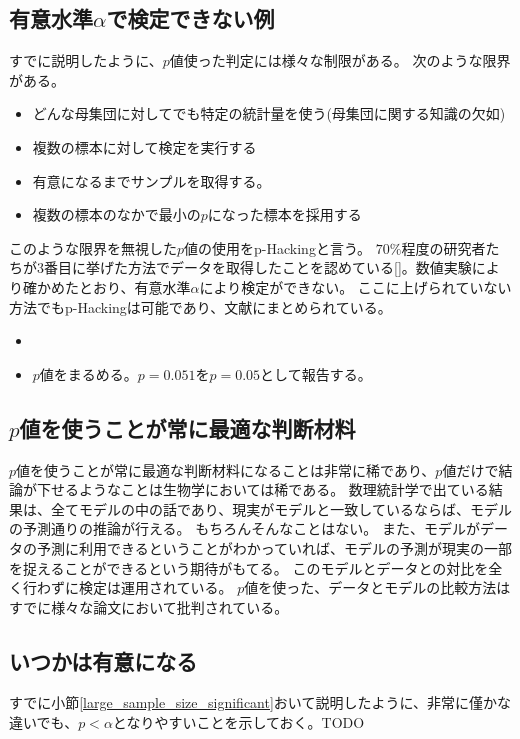 \subsection{有意水準$\alpha$で検定できない例}
すでに説明したように、$p$値使った判定には様々な制限がある。
次のような限界がある。

\begin{itemize}
  \item どんな母集団に対してでも特定の統計量を使う(母集団に関する知識の欠如)
  \item 複数の標本に対して検定を実行する
  \item 有意になるまでサンプルを取得する。
  \item 複数の標本のなかで最小の$p$になった標本を採用する
\end{itemize}

このような限界を無視した$p$値の使用をp-Hackingと言う。
$70\%$程度の研究者たちが3番目に挙げた方法でデータを取得したことを認めている[\cite{john2012measuring}]。数値実験により確かめたとおり、有意水準$\alpha$により検定ができない。
ここに上げられていない方法でもp-Hackingは可能であり、文献\cite{stefan2023big}にまとめられている。
\begin{itemize}
  \item 
  \item $p$値をまるめる。$p=0.051$を$p=0.05$として報告する。
\end{itemize}
\fi
\subsection{$p$値を使うことが常に最適な判断材料}
$p$値を使うことが常に最適な判断材料になることは非常に稀であり、$p$値だけで結論が下せるようなことは生物学においては稀である。
数理統計学で出ている結果は、全てモデルの中の話であり、現実がモデルと一致しているならば、モデルの予測通りの推論が行える。
もちろんそんなことはない。
また、モデルがデータの予測に利用できるということがわかっていれば、モデルの予測が現実の一部を捉えることができるという期待がもてる。
このモデルとデータとの対比を全く行わずに検定は運用されている。
$p$値を使った、データとモデルの比較方法はすでに様々な論文において批判されている\cite{points_of_significance}。


\subsection{いつかは有意になる}
すでに小節\ref{large_sample_size_significant}おいて説明したように、非常に僅かな違いでも、$p<\alpha$となりやすいことを示しておく。TODO



